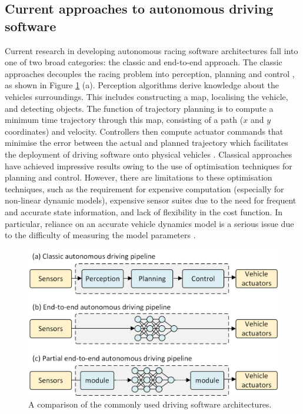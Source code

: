 \subsection{Current approaches to autonomous driving software}
Current research in developing autonomous racing software architectures fall into one of two broad categories: the classic and end-to-end approach.
The classic approaches decouples the racing problem into perception, planning and control \cite{Fuchs2021}, as shown in Figure \ref{fig:architecture_comparison} (a). 
Perception algorithms derive knowledge about the vehicles surroundings. 
This includes constructing a map, localising the vehicle, and detecting objects. 
The function of trajectory planning is to compute a minimum time trajectory through this map, consisting of a path ($x$ and $y$ coordinates) and velocity. Controllers then compute actuator commands that minimise the error between the actual and planned trajectory which facilitates the deployment of driving software onto physical vehicles \cite{Betz2021}. 
Classical approaches have achieved impressive results owing to the use of optimisation techniques for planning and control. 
However, there are limitations to these optimisation techniques, such as the requirement for expensive computation (especially for non-linear dynamic models), expensive sensor suites due to the need for frequent and accurate state information, and lack of flexibility in the cost function. 
In particular, reliance on an accurate vehicle dynamics model is a serious issue due to the difficulty of measuring the model parameters \cite{Kabzan2019, Pan2017}.

\begin{figure}[!htb]
\centering
\includegraphics[width=\textwidth*8/10]{contents/chapt1/figs/architecture_comparisons.png}
\caption[A comparison of the commonly used driving software architectures]{A comparison of the commonly used driving software architectures.}
\label{fig:architecture_comparison}
\end{figure}

